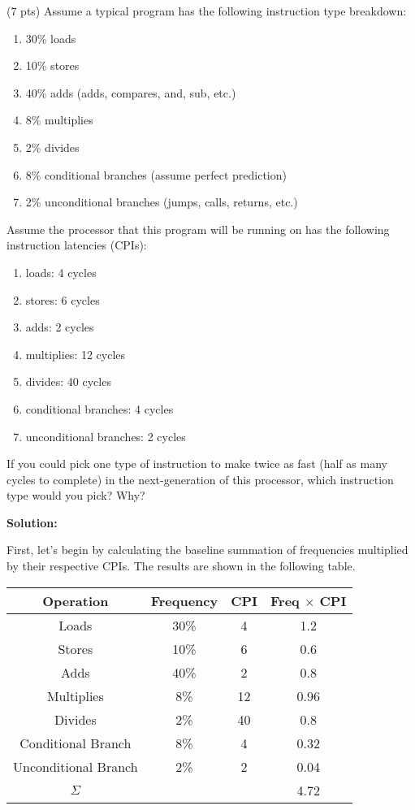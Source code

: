 \documentclass[10pt]{article} %
\begin{document}
\begin{enumerate}
(7 pts) Assume a typical program has the following instruction type breakdown:
\begin{enumerate} []
\item 30\% loads
\item 10\% stores
\item 40\% adds (adds, compares, and, sub, etc.)
\item 8\% multiplies
\item 2\% divides
\item 8\% conditional branches (assume perfect prediction)
\item 2\% unconditional branches (jumps, calls, returns, etc.)
\end{enumerate}
Assume the processor that this program will be running on has the following instruction latencies (CPIs):
\begin{enumerate} []
\item loads: 4 cycles 
\item stores: 6 cycles 
\item adds: 2 cycles 
\item multiplies: 12 cycles 
\item divides: 40 cycles
\item conditional branches: 4 cycles
\item unconditional branches: 2 cycles
\end{enumerate}
If you could pick one type of instruction to make twice as fast (half as many cycles to complete) in the next-generation of this processor, which instruction type would you pick? Why?

\textbf{Solution: }

First, let's begin by calculating the baseline summation of frequencies multiplied by their respective CPIs.  The results are shown in the following table.  

\begin{center}
\begin{tabular}{| c | c | c | c |}
\hline
Operation & Frequency & CPI & Freq $\times$ CPI \\
\hline
Loads & 30\% & 4 & 1.2 \\
Stores & 10\% & 6 & 0.6 \\
Adds & 40\% & 2 & 0.8 \\
Multiplies & 8\% & 12 & 0.96 \\
Divides & 2\% & 40 & 0.8 \\
Conditional Branch & 8\% & 4 & 0.32 \\
Unconditional Branch & 2\% & 2 & 0.04 \\
\hline
$\Sigma$ & & & 4.72 \\
\hline
\end{tabular}
\end{center}


\end{enumerate}
\end{document}
